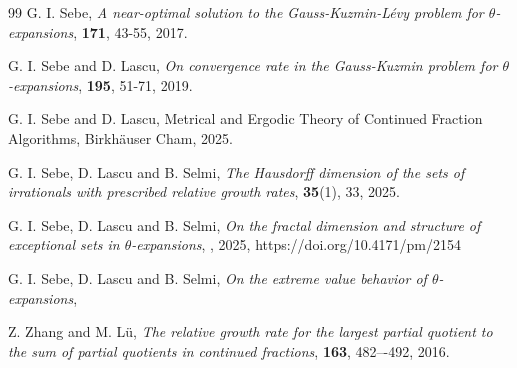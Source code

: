 \documentclass{article}
\numberwithin{equation}{section}
\begin{document}
\begin{thebibliography}{99}
G. I. Sebe, 
\textit{A near-optimal solution to the Gauss-Kuzmin-L\'evy problem for $\theta$-expansions}, 
 \textbf{171}, 43-55, 2017.

G. I. Sebe and D. Lascu,
\textit{On convergence rate in the Gauss-Kuzmin problem for $\theta$-expansions},
\textbf{195}, 51-71, 2019.

{ 
G. I. Sebe and D. Lascu, Metrical and Ergodic Theory of Continued Fraction Algorithms, Birkhäuser Cham, 2025.}

G. I. Sebe, D. Lascu and B. Selmi,
\textit{The Hausdorff dimension of the sets of irrationals with prescribed relative growth rates},  
\textbf{35}(1), 33, 2025.

G. I. Sebe, D. Lascu and B. Selmi,
\textit{On the fractal dimension and structure of exceptional sets in $\theta$-expansions},  
,
2025,
\newblock https://doi.org/10.4171/pm/2154 

G. I. Sebe, D. Lascu and B. Selmi,
\textit{On the extreme value behavior of $\theta$-expansions},  


 {Z.} Zhang and {M.} L\"u, \textit{The relative growth rate for the largest partial quotient to the sum of partial quotients in continued fractions}, 
 \textbf{163}, 482–-492, 2016.

\end{thebibliography}
\end{document}
